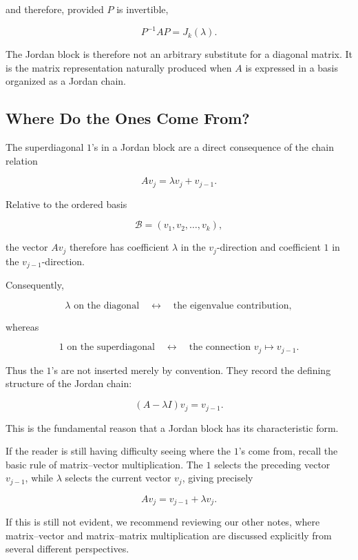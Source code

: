 \documentclass[11pt]{article}
\begin{document}
and therefore, provided \(P\) is invertible,

\[
\boxed{
P^{-1}AP=J_k(\lambda).
}
\]

The Jordan block is therefore not an arbitrary substitute for a
diagonal matrix.  It is the matrix representation naturally produced
when \(A\) is expressed in a basis organized as a Jordan chain.


\subsection{Where Do the Ones Come From?}

The superdiagonal \(1\)'s in a Jordan block are a direct consequence
of the chain relation

\[
Av_j=\lambda v_j+v_{j-1}.
\]

Relative to the ordered basis

\[
\mathcal{B}=(v_1,v_2,\ldots,v_k),
\]

the vector \(Av_j\) therefore has coefficient \(\lambda\) in the
\(v_j\)-direction and coefficient \(1\) in the \(v_{j-1}\)-direction.

Consequently,

\[
\boxed{
\lambda\text{ on the diagonal}
\quad\longleftrightarrow\quad
\text{the eigenvalue contribution},
}
\]

whereas

\[
\boxed{
1\text{ on the superdiagonal}
\quad\longleftrightarrow\quad
\text{the connection }v_j\mapsto v_{j-1}.
}
\]

Thus the \(1\)'s are not inserted merely by convention.  They record
the defining structure of the Jordan chain:

\[
\boxed{
(A-\lambda I)v_j=v_{j-1}.
}
\]

This is the fundamental reason that a Jordan block has its
characteristic form.

If the reader is still having difficulty seeing where the \(1\)'s come
from, recall the basic rule of matrix--vector multiplication.  The
\(1\) selects the preceding vector \(v_{j-1}\), while \(\lambda\)
selects the current vector \(v_j\), giving precisely

\[
Av_j=v_{j-1}+\lambda v_j.
\]

If this is still not evident, we recommend reviewing our other notes,
where matrix--vector and matrix--matrix multiplication are discussed
explicitly from several different perspectives.
\end{document}
